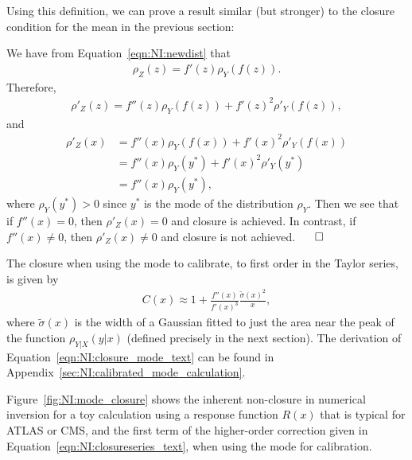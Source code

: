 \noindent Using this definition, we can prove a result similar (but stronger) to the closure condition for the mean in the previous section:

\vspace{5mm}


\vspace{5mm}

 We have from Equation~\ref{eqn:NI:newdist} that
\begin{align}
\rho_Z(z) = f'(z)\rho_Y(f(z)).
\end{align}
Therefore,
\begin{align}
\rho'_Z(z) = f''(z)\rho_Y(f(z))+f'(z)^2\rho'_Y(f(z)),
\end{align}
and
\begin{align}
\rho'_Z(x) &= f''(x)\rho_Y(f(x))+f'(x)^2\rho'_Y(f(x))\nonumber\\
&=f''(x)\rho_Y(y^*)+f'(x)^2\rho'_Y(y^*)\nonumber\\
&=f''(x)\rho_Y(y^*),
\end{align}
where $\rho_Y(y^*)>0$ since $y^*$ is the mode of the distribution $\rho_Y$. Then we see that if $f''(x)=0$, then $\rho'_Z(x)=0$ and closure is achieved.  In contrast, if $f''(x)\ne 0$, then $\rho'_Z(x)\ne 0$ and closure is not achieved. $\hspace{0.5 cm}\Box$

\vspace{5mm}

\noindent The closure when using the mode to calibrate, to first order in the Taylor series, is given by
\begin{align}
  C(x) \approx 1+\frac{f''(x)}{f'(x)^3}\frac{\tilde{\sigma}(x)^2}{x},
\label{eqn:NI:closure_mode_text}
\end{align}
where $\tilde{\sigma}(x)$ is the width of a Gaussian fitted to just the area near the peak of the function $\rho_{Y|X}(y|x)$ (defined precisely in the next section). The derivation of Equation~\ref{eqn:NI:closure_mode_text} can be found in Appendix~\ref{sec:NI:calibrated_mode_calculation}.

Figure~\ref{fig:NI:mode_closure} shows the inherent non-closure in numerical inversion for a toy calculation using a response function $R(x)$ that is typical for ATLAS or CMS, and the first term of the higher-order correction given in Equation~\ref{eqn:NI:closureseries_text}, when using the mode for calibration.


